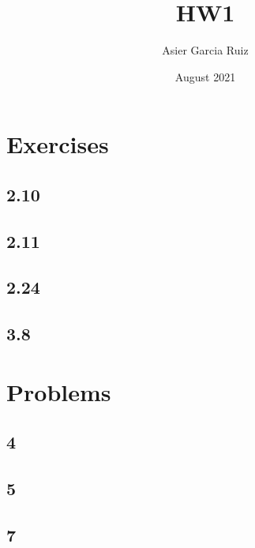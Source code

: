 \documentclass{article}
\title{HW1}
\author{Asier Garcia Ruiz }
\date{August 2021}
\begin{document}
    \maketitle
    \section*{Exercises}
    \subsection*{2.10}
    \subsection*{2.11}
    \subsection*{2.24}
    \subsection*{3.8}
    \section*{Problems}
    \subsection*{4}
    \subsection*{5}
    \subsection*{7}
\end{document}
